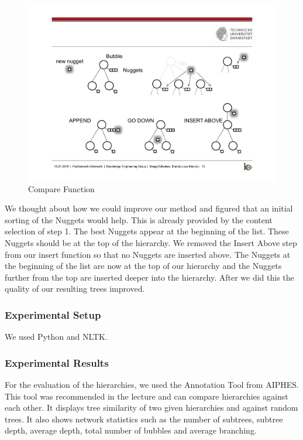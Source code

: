 \begin{figure}[H]
	\centering
	\includegraphics[trim=22.5cm 12.5cm 2.5cm 5.5cm, clip=true]{img/step2_func.pdf}
	\caption{Compare Function}
	\label{fig:jsd}
\end{figure}


We thought about how we could improve our method and figured that an initial sorting of the Nuggets would help. This is already provided by the content selection of step 1. The best Nuggets appear at the beginning of the list. These Nuggets should be at the top of the hierarchy. We removed the Insert Above step from our insert function so that no Nuggets are inserted above. The Nuggets at the beginning of the list are now at the top of our hierarchy and the Nuggets further from the top are inserted deeper into the hierarchy. After we did this the quality of our resulting trees improved.

\subsubsection{Experimental Setup}

We used Python and NLTK.

\subsubsection{Experimental Results}


For the evaluation of the hierarchies, we used the Annotation Tool from AIPHES. This tool was recommended in the lecture and can compare hierarchies against each other. It displays tree similarity of two given hierarchies and against random trees. It also shows network statistics such as the number of subtrees, subtree depth, average depth, total number of bubbles and average branching.

